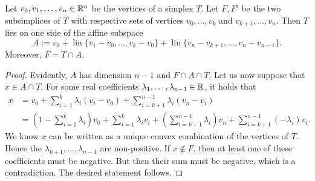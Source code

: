 \documentclass[a4paper]{article}
\begin{document}
\begin{lemma}\label{lemma:oppositesubsimplex}
    Let $v_0, v_1, \dots, v_n \in {\mathbb R}^n$ be the vertices of a simplex $T$.
    Let $F, F'$ be the two subsimplices of $T$ with respective sets of vertices $v_0,\dots,v_k$ and $v_{k+1},\dots,v_n$.
    Then $T$ lies on one side of the affine subspace
    \[
        A := v_0 + \operatorname{lin}\{ v_1 - v_0, \dots, v_k - v_0 \} +  \operatorname{lin}\{ v_n - v_{k+1}, \dots, v_n - v_{n-1} \}.
    \]
    Moreover, $F = T \cap A$.
\end{lemma}
\begin{proof}
    Evidently, $A$ has dimension $n-1$ and $F \cap A \cap T$.
    Let us now suppose that $x \in A \cap T$.
    For some real coefficients $\lambda_1,\dots,\lambda_{n-1} \in {\mathbb R}$, it holds that 
    \begin{align}
        x 
        &
        = 
        v_0 + \sum_{i=1}^{k} \lambda_{i} ( v_i - v_0 ) + \sum_{i=k+1}^{n-1} \lambda_{i} ( v_n - v_i )
        \\&
        = 
        \left( 1 - \sum_{i=1}^{k} \lambda_{i} \right) v_0 
        + 
        \sum_{i=1  }^{k  } \lambda_{i} v_i 
        + 
        \left( \sum_{i=k+1}^{n-1} \lambda_{i} \right) v_n
        + 
        \sum_{i=k+1}^{n-1} (-\lambda_{i}) v_i 
        .
    \end{align}
    We know $x$ can be written as a unique convex combination of the vertices of $T$.
    Hence the $\lambda_{k+1}, \dots, \lambda_{n-1}$ are non-positive. 
    If $x \notin F$, then at least one of these coefficients must be negative. 
    But then their sum must be negative, which is a contradiction. 
    The desired statement follows.         
\end{proof}
\end{document}
